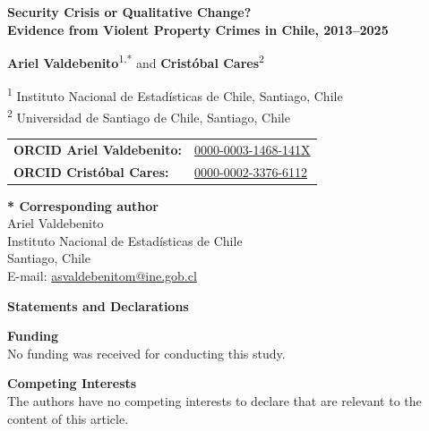 \documentclass[12pt]{article}
\begin{document}
\begin{center}

{\Large\bfseries Security Crisis or Qualitative Change?\\[6pt]
Evidence from Violent Property Crimes in Chile, 2013--2025}

\vspace{1.5cm}

{\large
\textbf{Ariel Valdebenito}\textsuperscript{1,*}
\quad and \quad
\textbf{Crist\'obal Cares}\textsuperscript{2}
}

\vspace{1cm}

\textsuperscript{1} Instituto Nacional de Estad\'isticas de Chile, Santiago, Chile\\[4pt]
\textsuperscript{2} Universidad de Santiago de Chile, Santiago, Chile

\vspace{1cm}

\begin{tabular}{ll}
\textbf{ORCID Ariel Valdebenito:}   & \href{https://orcid.org/0000-0003-1468-141X}{0000-0003-1468-141X} \\[4pt]
\textbf{ORCID Crist\'obal Cares:}   & \href{https://orcid.org/0000-0002-3376-6112}{0000-0002-3376-6112} \\
\end{tabular}

\vspace{1.5cm}

\textbf{* Corresponding author}\\[6pt]
Ariel Valdebenito\\
Instituto Nacional de Estad\'isticas de Chile\\
Santiago, Chile\\
E-mail: \href{mailto:asvaldebenitom@ine.gob.cl}{asvaldebenitom@ine.gob.cl}

\end{center}

\vspace{2cm}

\noindent\textbf{\large Statements and Declarations}

\vspace{0.8cm}

\noindent\textbf{Funding}\\
No funding was received for conducting this study.

\vspace{0.6cm}

\noindent\textbf{Competing Interests}\\
The authors have no competing interests to declare that are relevant to the content of this article.
\end{document}
